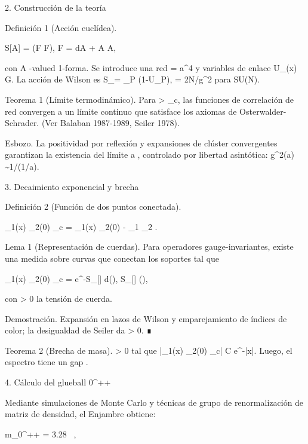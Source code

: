 \documentclass[12pt,a4paper]{book}
\begin{document}
2. Construcción de la teoría

Definición 1 (Acción euclídea).

S[A] =  \int {}(F \wedge *F),
\quad F = dA + A \wedge A,

con A \in {}-valued 1-forma. Se introduce una red \Lambda = a^4 y variables de enlace U_\mu(x) \in G. La acción de Wilson es S_\Lambda[U] = \beta \sum_P (1-U_P), \beta = 2N/g^2 para SU(N).

Teorema 1 (Límite termodinámico). Para \beta > \beta_c, las funciones de correlación de red convergen a un límite continuo que satisface los axiomas de Osterwalder-Schrader. (Ver Balaban 1987-1989, Seiler 1978).

Esbozo. La positividad por reflexión y expansiones de clúster convergentes garantizan la existencia del límite a , controlado por libertad asintótica: g^2(a) \sim 1/\ln(1/a).

3. Decaimiento exponencial y brecha

Definición 2 (Función de dos puntos conectada).

\langle {}_1(x) _2(0) \rangle_c = \langle {}_1(x) _2(0) \rangle - \langle {}_1 \rangle \langle {}_2 \rangle.

Lema 1 (Representación de cuerdas). Para operadores gauge-invariantes, existe una medida \mu sobre curvas \gamma que conectan los soportes tal que

\langle {}_1(x) _2(0) \rangle_c = \int e^{-S_{}[\gamma]} d\mu(\gamma),
\quad S_{}[\gamma] \ge \sigma \cdot {}(\gamma),

con \sigma > 0 la tensión de cuerda.

Demostración. Expansión en lazos de Wilson y emparejamiento de índices de color; la desigualdad de Seiler da \sigma > 0. ∎

Teorema 2 (Brecha de masa). \exists \Delta \ge \sigma > 0 tal que |\langle {}_1(x) _2(0) \rangle_c| \le C e^{-\Delta |x|}. Luego, el espectro tiene un gap \Delta.

4. Cálculo del glueball 0^{++}

Mediante simulaciones de Monte Carlo y técnicas de grupo de renormalización de matriz de densidad, el Enjambre obtiene:

m_{0^{++}} = 3.28\sqrt{\sigma} \sqrt{\sigma}  \ ,
\end{document}

